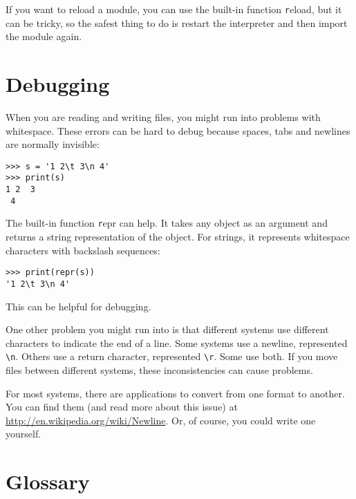 \documentclass[
DIV=11,
fontsize=13,
twoside,
headinclude=false,
titlepage=firstiscover,
abstract=true,
headsepline=true,
footsepline=true,
chapterprefix=true, %
headings=big,
bibliography=totoc,%
captions=tableheading
]{scrbook}
\theoremstyle{definition}
\begin{document}
If you want to reload a module, you can use the built-in function 
{\texttt reload}, but it can be tricky, so the safest thing to do is
restart the interpreter and then import the module again.


\section{Debugging}

When you are reading and writing files, you might run into problems
with whitespace.  These errors can be hard to debug because spaces,
tabs and newlines are normally invisible:

\begin{lstlisting}
>>> s = '1 2\t 3\n 4'
>>> print(s)
1 2	 3
 4
\end{lstlisting}

The built-in function {\texttt repr} can help.  It takes any object as an
argument and returns a string representation of the object.  For
strings, it represents whitespace
characters with backslash sequences:

\begin{lstlisting}
>>> print(repr(s))
'1 2\t 3\n 4'
\end{lstlisting}

This can be helpful for debugging.

One other problem you might run into is that different systems
use different characters to indicate the end of a line.  Some
systems use a newline, represented \verb"\n".  Others use
a return character, represented \verb"\r".  Some use both.
If you move files between different systems, these inconsistencies
can cause problems.

For most systems, there are applications to convert from one
format to another.  You can find them (and read more about this
issue) at \url{http://en.wikipedia.org/wiki/Newline}.  Or, of course, you
could write one yourself.


\section{Glossary}
\end{document}
